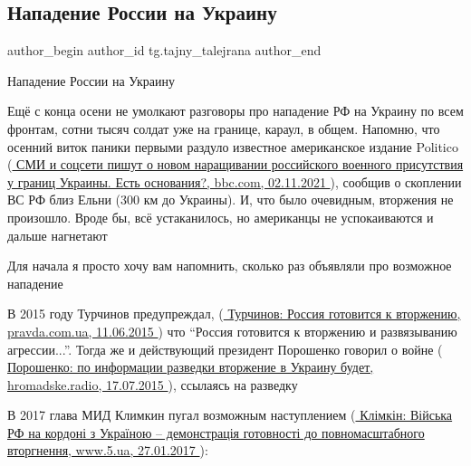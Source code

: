  
 
 
 
 
\subsection{Нападение России на Украину}
\label{sec:22_01_2022.tg.tajny_talejrana.1.napadenie_rossii}
 
\ifcmt
 author_begin
   author_id tg.tajny_talejrana
 author_end
\fi

Нападение России на Украину

Ещё с конца осени не умолкают разговоры про нападение РФ на Украину по всем
фронтам, сотни тысяч солдат уже на границе, караул, в общем. Напомню, что
осенний виток паники первыми раздуло известное американское издание Politico
(\href{https://www.bbc.com/russian/features-59139673}{
СМИ и соцсети пишут о новом наращивании российского военного присутствия у границ Украины. Есть основания?, %
bbc.com, 02.11.2021%
}), сообщив о скоплении ВС РФ близ
Ельни (300 км до Украины). И, что было очевидным, вторжения не произошло. Вроде
бы, всё устаканилось, но американцы не успокаиваются и дальше нагнетают

Для начала я просто хочу вам напомнить, сколько раз объявляли про возможное
нападение 

В 2015 году Турчинов предупреждал,
(\href{https://www.pravda.com.ua/rus/news/2015/06/11/7070980/}{%
Турчинов: Россия готовится к вторжению, pravda.com.ua, 11.06.2015%
}) что \enquote{Россия готовится
к вторжению и развязыванию агрессии...}. Тогда же и действующий президент
Порошенко говорил о войне
(\href{https://hromadske.radio/ru/news/2015/07/17/poroshenko-po-informacii-razvedki-vtorzhenie-v-ukrainu-budet}{%
Порошенко: по информации разведки вторжение в Украину будет, hromadske.radio, 17.07.2015%
}),
ссылаясь на разведку

В 2017 глава МИД Климкин пугал возможным наступлением
(\href{https://www.5.ua/polityka/klimkin-rozpoviv-chomu-narazi-provedennia-zustrichi-u-normandskomu-formati-nemozhlyve-136977.html}{%
Клімкін: Війська РФ на кордоні з Україною – демонстрація готовності до повномасштабного вторгнення, %
www.5.ua, 27.01.2017%
}):

